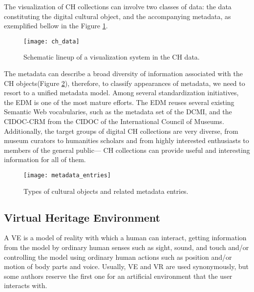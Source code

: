 The visualization of \gls{CH} collections can involve two classes of data: the data constituting the digital cultural object, and
the accompanying metadata, as exemplified bellow in the Figure \ref{fig:ch_data}. 

\begin{figure}[h!]
    \centering
    \texttt{[image: ch\_data]}
    \caption{Schematic lineup of a visualization system in the CH data. ~\cite{Windhager2019Visualization}}
    \label{fig:ch_data}
\end{figure}
\FloatBarrier


The metadata can describe a broad diversity of information associated
with the \gls{CH} objects(Figure \ref{fig:ch_objects}), therefore, to classify appearances of metadata, we need to resort to a unified metadata model. 
Among several standardization initiatives, the \gls{EDM} is one of the most mature efforts. 
The \gls{EDM} reuses several existing Semantic Web vocabularies, such as the metadata set of the \gls{DCMI}, and the
\gls{CIDOC-CRM} from the \gls{CIDOC} of the International Council of Museums. 
Additionally, the target groups of digital CH collections are very diverse, from museum curators to humanities scholars and from
highly interested enthusiasts to members of the general public— \gls{CH} collections can provide useful and interesting information for all of them. 


\begin{figure}[h!]
    \centering
    \texttt{[image: metadata\_entries]}
    \caption{Types of cultural objects and related metadata entries. ~\cite{Windhager2019Visualization}}
    \label{fig:ch_objects}
\end{figure}
\FloatBarrier


\subsection{Virtual Heritage Environment}
\label{sec:virtual_heritage}

A \gls{VE} is a model of reality with which a human can interact, getting information 
from the model by ordinary human senses such as sight, sound, and touch and/or controlling the model using ordinary human actions such as position and/or motion of body parts 
and voice. Usually, \gls{VE} and \gls{VR} are used synonymously, but 
some authors reserve the first one for an artificial environment that the user interacts with.  ~\cite{hale2014handbook}


